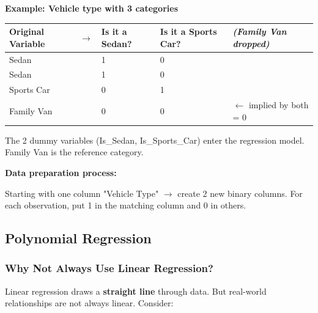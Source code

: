 \documentclass[12pt,openany]{book}
\begin{document}
\textbf{Example: Vehicle type with 3 categories}

\begin{center}
\scriptsize
\renewcommand{\arraystretch}{1.15}
\begin{tabular}{|L{0.14\textwidth}|L{0.06\textwidth}|L{0.13\textwidth}|L{0.15\textwidth}|L{0.20\textwidth}|}
\hline
    Original Variable & \(\rightarrow\) & Is it a Sedan? & Is it a Sports Car? & \textit{(Family Van dropped)} \\
\hline
    Sedan &  & 1 & 0 &  \\
\hline
    Sedan &  & 1 & 0 &  \\
\hline
    Sports Car &  & 0 & 1 &  \\
\hline
    Family Van &  & 0 & 0 & \(\leftarrow\) implied by both = 0 \\
\hline
\end{tabular}
\end{center}
\normalsize


The 2 dummy variables (Is\_Sedan, Is\_Sports\_Car) enter the regression model. Family Van is the reference category.

\textbf{Data preparation process:}

Starting with one column "Vehicle Type" \(\rightarrow\) create 2 new binary columns. For each observation, put 1 in the matching column and 0 in others.

\medskip


\subsection{Polynomial Regression}


\subsubsection{Why Not Always Use Linear Regression?}


Linear regression draws a \textbf{straight line} through data. But real-world relationships are not always linear. Consider:


\begin{center}
\end{center}
\end{document}
